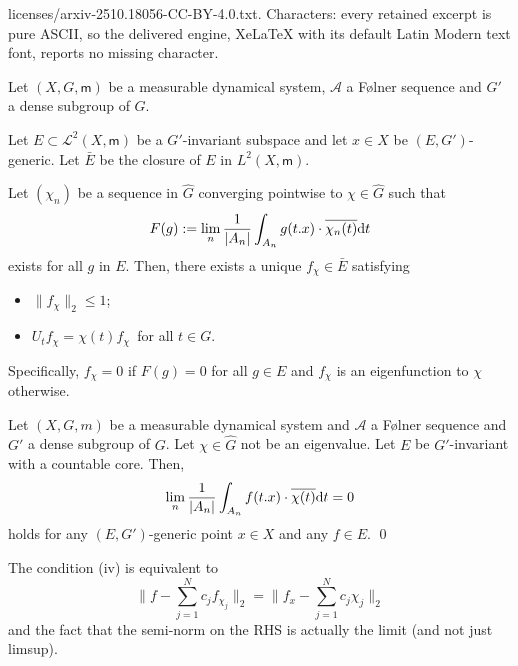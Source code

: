 \documentclass[10pt,a4paper]{amsart}
\newcommand{\cA}{{\mathcal A}}
\newcommand{\dd}{\mbox{\rm d}}
\newcommand{\mm}{\mathsf{m}}
\begin{document}
licenses/arxiv-2510.18056-CC-BY-4.0.txt. Characters: every retained excerpt is pure ASCII, so the delivered engine, XeLaTeX with its default Latin Modern text font, reports no missing character.
\begin{lemma} \label{lem-eigen-exi} Let $(X,G, \mm)$ be a measurable dynamical system, $\cA$ a F\o lner sequence and $G'$ a dense subgroup of $G$.

Let $E\subset \mathcal{L}^2 (X,\mm)$ be a $G'$-invariant subspace and let $x\in X$ be $(E,G')$-generic. Let $\bar{E}$ be the closure of $E$ in $L^2(X, \mm)$.

Let $(\chi_n)$ be a sequence in $\widehat{G}$  converging pointwise to $\chi \in \widehat{G}$ such that
$$ F(g):= \lim_n\frac{1}{|A_n|} \int_{A_n} g(t.x) \cdot \overline{\chi_n(t)} \dd t$$
exists for all $g$ in $E$. Then, there exists a unique  $f_\chi \in \bar{E}$  satisfying
\begin{itemize}
  \item{} $\| f_\chi \|_2 \leq 1$;
  \item{} $U_t f_\chi = \chi(t) f_\chi \,$ for all $t\in G$.
\end{itemize}
Specifically, $f_\chi =0$ if $F(g) = 0$ for all $g\in E$ and  $f_\chi$ is an eigenfunction to $\chi$ otherwise.
\end{lemma}

\begin{corollary} \label{cor-van}
 Let $(X,G,m)$ be a measurable dynamical system and $\cA$ a F\o lner sequence and $G'$ a dense subgroup of $G$. Let $\chi\in \widehat{G}$ not be an eigenvalue.   Let $E$ be   $G'$-invariant with a countable core. Then,
$$\lim_n \frac{1}{|A_n|} \int_{A_n}  f(t.x) \cdot \overline{\chi(t)}  \dd t =0$$
holds for any $(E,G')$-generic point $x \in X$ and any $f \in E$. \qed
\end{corollary}

\begin{remark} The condition (iv) is equivalent to
\[
\| f- \sum_{j=1}^N c_j f_{\chi_j} \|_2= \|f_x - \sum_{j=1}^N c_j \chi_j  \|_2
\]
and the fact that the semi-norm on the RHS is actually the limit (and not just limsup).
\end{remark}
\end{document}
